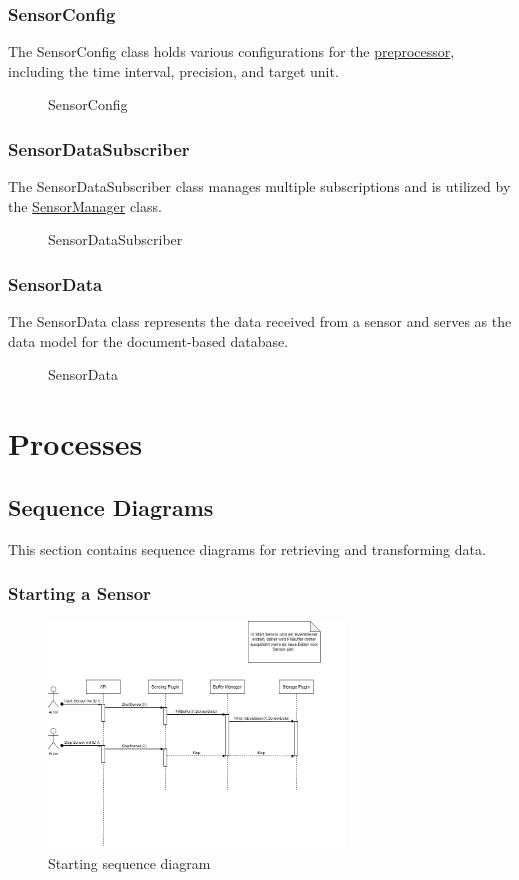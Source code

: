 \documentclass[12pt]{article}
\newcounter{fr}
\begin{document}
\subsubsection{SensorConfig}
The SensorConfig class holds various configurations for the \hyperref[fig:bild13]{preprocessor}, including the time interval, precision, and target unit.
\begin{figure}[ht]
\centering

\caption{\label{fig:bild14} SensorConfig}
\end{figure}


\subsubsection{SensorDataSubscriber}
The SensorDataSubscriber class manages multiple subscriptions and is utilized by the \hyperref[fig:bild9]{SensorManager} class.
\begin{figure}[ht]
\centering

\caption{\label{fig:bild15} SensorDataSubscriber}
\end{figure}
\newpage
\subsubsection{SensorData}
The SensorData class represents the data received from a sensor and serves as the data model for the document-based database.
\begin{figure}[ht]
\centering

\caption{\label{fig:bild16} SensorData}
\end{figure}


\section{Processes}
\subsection{Sequence Diagrams}
This section contains sequence diagrams for retrieving and transforming data.
\subsubsection{Starting a Sensor}
\begin{figure}[ht]
\centering
\includegraphics[width=0.7\textwidth]{Graphics/SeqStart.png}
\caption{\label{fig:bild17} Starting sequence diagram}
\end{figure}
\end{document}
